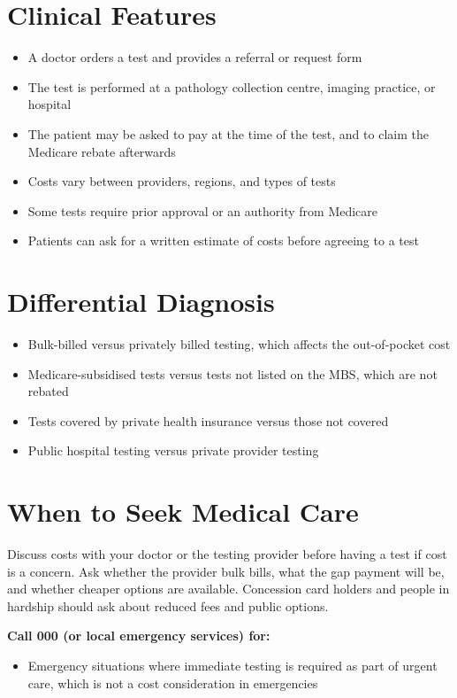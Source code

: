 \section*{Clinical Features}
\begin{itemize}
    \item A doctor orders a test and provides a referral or request form
    \item The test is performed at a pathology collection centre, imaging practice, or hospital
    \item The patient may be asked to pay at the time of the test, and to claim the Medicare rebate afterwards
    \item Costs vary between providers, regions, and types of tests
    \item Some tests require prior approval or an authority from Medicare
    \item Patients can ask for a written estimate of costs before agreeing to a test
\end{itemize}

\section*{Differential Diagnosis}
\begin{itemize}
    \item Bulk-billed versus privately billed testing, which affects the out-of-pocket cost
    \item Medicare-subsidised tests versus tests not listed on the MBS, which are not rebated
    \item Tests covered by private health insurance versus those not covered
    \item Public hospital testing versus private provider testing
\end{itemize}

\section*{When to Seek Medical Care}
Discuss costs with your doctor or the testing provider before having a test if cost is a concern. Ask whether the provider bulk bills, what the gap payment will be, and whether cheaper options are available. Concession card holders and people in hardship should ask about reduced fees and public options.

\textbf{Call 000 (or local emergency services) for:}
\begin{itemize}
    \item Emergency situations where immediate testing is required as part of urgent care, which is not a cost consideration in emergencies
\end{itemize}


